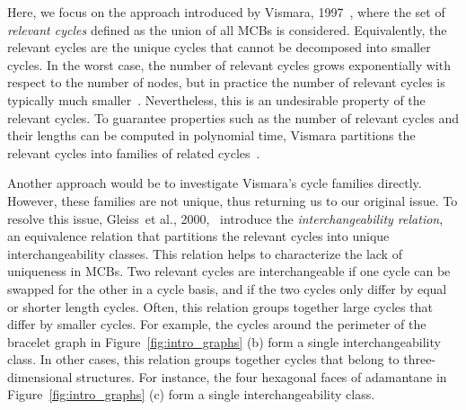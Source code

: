 \documentclass[fleqn,11pt]{article}
\begin{document}
Here, we focus on the approach introduced by Vismara, 1997~\cite{vismaraUnion1997}, where the set of \emph{relevant cycles} defined as the union of all MCBs is considered. 
Equivalently, the relevant cycles are the unique cycles that cannot be decomposed into smaller cycles. 
In the worst case, the number of relevant cycles grows exponentially with respect to the number of nodes, but in practice the number of relevant cycles is typically much smaller~\cite{mayEfficient2014}. 
Nevertheless, this is an undesirable property of the relevant cycles. 
To guarantee properties such as the number of relevant cycles and their lengths can be computed in polynomial time, Vismara partitions the relevant cycles into families of related cycles~\cite{vismaraUnion1997}.


Another approach would be to investigate Vismara's cycle families directly. However,  these families are not unique, thus returning us to our original issue. 
To resolve this issue, Gleiss~{et al.}, 2000,~\cite{gleissInterchangeability2000} introduce the \emph{interchangeability relation}, an equivalence relation that partitions the relevant cycles into unique interchangeability classes. 
This relation helps to characterize the lack of uniqueness in MCBs.
Two relevant cycles are interchangeable if one cycle can be swapped for the other in a cycle basis, and if the two cycles only differ by equal or shorter length cycles. 
Often, this relation groups together large cycles that differ by smaller cycles. 
For example, the cycles around the perimeter of the bracelet graph in Figure~\ref{fig:intro_graphs} (b) form a single interchangeability class. 
In other cases, this relation groups together cycles that belong to three-dimensional structures. 
For instance, the four hexagonal faces of adamantane in Figure~\ref{fig:intro_graphs} (c) form a single interchangeability class.
\end{document}
